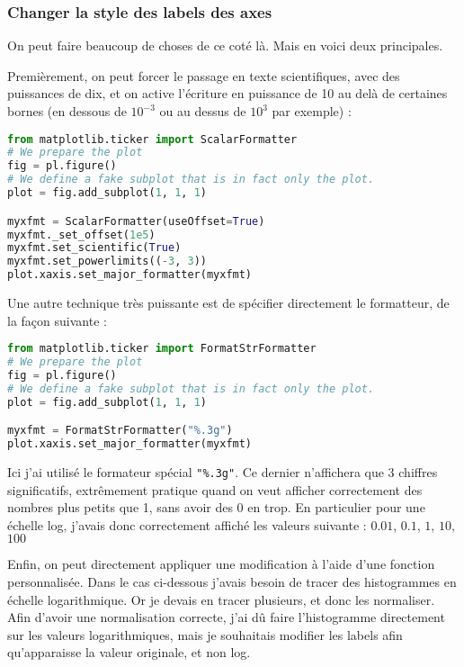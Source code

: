 \documentclass[a4paper,twoside]{article}
\begin{document}
\subsubsection{Changer la style des labels des axes}
On peut faire beaucoup de choses de ce coté là. Mais en voici deux principales. 

Premièrement, on peut forcer le passage en texte scientifiques, avec des puissances de dix, et on active l'écriture en puissance de 10 au delà de certaines bornes (en dessous de $10^{-3}$ ou au dessus de $10^3$ par exemple) : 
\begin{lstlisting}[language=python]
from matplotlib.ticker import ScalarFormatter
# We prepare the plot
fig = pl.figure()
# We define a fake subplot that is in fact only the plot.
plot = fig.add_subplot(1, 1, 1)

myxfmt = ScalarFormatter(useOffset=True)
myxfmt._set_offset(1e5)
myxfmt.set_scientific(True)
myxfmt.set_powerlimits((-3, 3)) 
plot.xaxis.set_major_formatter(myxfmt)
\end{lstlisting}

\bigskip

Une autre technique très puissante est de spécifier directement le formatteur, de la façon suivante : 
\begin{lstlisting}[language=python]
from matplotlib.ticker import FormatStrFormatter
# We prepare the plot
fig = pl.figure()
# We define a fake subplot that is in fact only the plot.
plot = fig.add_subplot(1, 1, 1)

myxfmt = FormatStrFormatter("%.3g")
plot.xaxis.set_major_formatter(myxfmt)
\end{lstlisting}

Ici j'ai utilisé le formateur spécial \verb|"%.3g"|. Ce dernier n'affichera que 3 chiffres significatifs, extrêmement pratique
quand on veut afficher correctement des nombres plus petits que 1, sans avoir des 0 en trop. En particulier pour une échelle
log, j'avais donc correctement affiché les valeurs suivante : $0.01$, $0.1$, $1$, $10$, $100$

\bigskip

Enfin, on peut directement appliquer une modification à l'aide d'une fonction personnalisée. Dans le cas ci-dessous j'avais
besoin de tracer des histogrammes en échelle logarithmique. Or je devais en tracer plusieurs, et donc les normaliser. Afin
d'avoir une normalisation correcte, j'ai dû faire l'histogramme directement sur les valeurs logarithmiques, mais je souhaitais
modifier les labels afin qu'apparaisse la valeur originale, et non log. 
\end{document}
